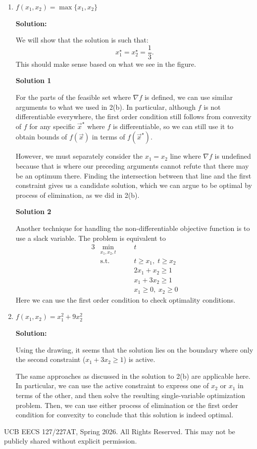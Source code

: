 \documentclass[10pt]{article}
\begin{document}
\begin{enumerate}[label=(\alph*), resume]
    \textbf{Solution:} The set of solutions is $S = \{\vec{x} : x_1 = 0 \text{ and } x_2 \geq 1\}$. This can be shown using similar arguments to what we used for 2(b).

    \item $f(x_1, x_2) = \max\{x_1, x_2\}$

    \textbf{Solution:}

    We will show that the solution is such that:
    \begin{equation}
        x_1^\star = x_2^\star = \frac{1}{3}.
    \end{equation}
    This should make sense based on what we see in the figure.

    \textbf{Solution 1}

    For the parts of the feasible set where $\nabla f$ is defined, we can use similar arguments to what we used in 2(b). In particular, although $f$ is not differentiable everywhere, the first order condition still follows from convexity of $f$ for any specific $\vec{x}^\star$ where $f$ is differentiable, so we can still use it to obtain bounds of $f(\vec{x})$ in terms of $f(\vec{x}^\star)$.

    However, we must separately consider the $x_1 = x_2$ line where $\nabla f$ is undefined because that is where our preceding arguments cannot refute that there may be an optimum there. Finding the intersection between that line and the first constraint gives us a candidate solution, which we can argue to be optimal by process of elimination, as we did in 2(b).

    \textbf{Solution 2}

    Another technique for handling the non-differentiable objective function is to use a slack variable. The problem is equivalent to
    \begin{alignat}{3}
        &\min_{x_1, x_2, t} &\quad& t \\
        &\text{s.t.} && t \geq x_1,\; t \geq x_2 \\
        &&& 2x_1 + x_2 \geq 1 \\
        &&& x_1 + 3x_2 \geq 1 \\
        &&& x_1 \geq 0,\; x_2 \geq 0
    \end{alignat}
    Here we can use the first order condition to check optimality conditions.

    \item $f(x_1, x_2) = x_1^2 + 9x_2^2$

    \textbf{Solution:}

    Using the drawing, it seems that the solution lies on the boundary where only the second constraint ($x_1 + 3x_2 \geq 1$) is active.

    The same approaches as discussed in the solution to 2(b) are applicable here. In particular, we can use the active constraint to express one of $x_2$ or $x_1$ in terms of the other, and then solve the resulting single-variable optimization problem. Then, we can use either process of elimination or the first order condition for convexity to conclude that this solution is indeed optimal.
\end{enumerate}

\vfill
\noindent\textcopyright{} UCB EECS 127/227AT, Spring 2026. All Rights Reserved. This may not be publicly shared without explicit permission.
\end{document}
